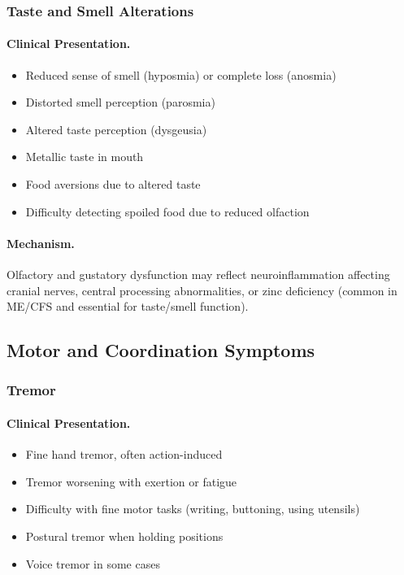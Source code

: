 \subsubsection{Taste and Smell Alterations}

\paragraph{Clinical Presentation.}
\begin{itemize}
    \item Reduced sense of smell (hyposmia) or complete loss (anosmia)
    \item Distorted smell perception (parosmia)
    \item Altered taste perception (dysgeusia)
    \item Metallic taste in mouth
    \item Food aversions due to altered taste
    \item Difficulty detecting spoiled food due to reduced olfaction
\end{itemize}

\paragraph{Mechanism.}
Olfactory and gustatory dysfunction may reflect neuroinflammation affecting cranial nerves, central processing abnormalities, or zinc deficiency (common in ME/CFS and essential for taste/smell function).

\subsection{Motor and Coordination Symptoms}
\label{subsec:motor-symptoms}

\subsubsection{Tremor}

\paragraph{Clinical Presentation.}
\begin{itemize}
    \item Fine hand tremor, often action-induced
    \item Tremor worsening with exertion or fatigue
    \item Difficulty with fine motor tasks (writing, buttoning, using utensils)
    \item Postural tremor when holding positions
    \item Voice tremor in some cases
\end{itemize}

